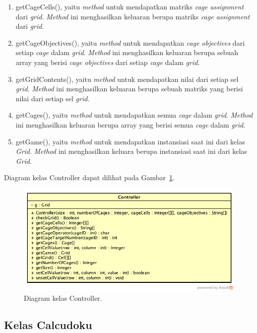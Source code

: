 \begin{enumerate}
\item getCageCells(), yaitu \textit{method} untuk mendapatkan matriks \textit{cage assignment} dari \textit{grid}. \textit{Method} ini menghasilkan keluaran berupa matriks \textit{cage assignment} dari \textit{grid}.
\item getCageObjectives(), yaitu \textit{method} untuk mendapatkan \textit{cage objectives} dari setiap \textit{cage} dalam \textit{grid}. \textit{Method} ini menghasilkan keluaran berupa sebuah array yang berisi \textit{cage objectives} dari setiap \textit{cage} dalam \textit{grid}.
\item getGridContents(), yaitu \textit{method} untuk mendapatkan nilai dari setiap sel \textit{grid}. \textit{Method} ini menghasilkan keluaran berupa sebuah matriks yang berisi nilai dari setiap sel \textit{grid}.
\item getCages(), yaitu \textit{method} untuk mendapatkan semua \textit{cage} dalam \textit{grid}. \textit{Method} ini menghasilkan keluaran berupa array yang berisi semua \textit{cage} dalam \textit{grid}.
\item getGame(), yaitu \textit{method} untuk mendapatkan instansiasi saat ini dari kelas \textit{Grid}. \textit{Method} ini menghasilkan keluara berupa instansiasi saat ini dari kelas \textit{Grid}.
\end{enumerate}

Diagram kelas Controller dapat dilihat pada Gambar~\ref{fig:diagramkelascontroller}.

\begin{figure}
\centering
\captionsetup{justification=centering}
\includegraphics[scale=0.5]{Gambar/Perancangan/DiagramKelasController.png}
\caption[Diagram kelas Controller.]{Diagram kelas Controller.}
\label{fig:diagramkelascontroller}
\end{figure}

\subsection{Kelas Calcudoku}
\label{sec:kelascalcudoku}


